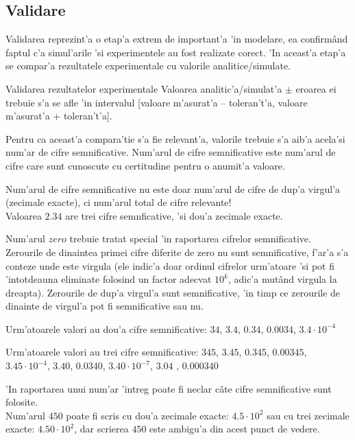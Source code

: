 \subsection*{Validare}

Validarea reprezint'a o etap'a extrem de important'a 'in modelare, ea confirm\^and faptul c'a simul'arile 'si experimentele au fost realizate corect. 'In aceast'a etap'a se compar'a rezultatele experimentale cu valorile analitice/simulate. 

\begin{retine}Validarea rezultatelor experimentale
Valoarea analitic'a/simulat'a $\pm$ eroarea ei trebuie s'a se afle 'in intervalul [valoare m'asurat'a -- toleran't'a, valoare m'asurat'a + toleran't'a].
\end{retine}

Pentru ca aceast'a compara'tie s'a fie relevant'a, valorile trebuie s'a aib'a acela'si num'ar de cifre semnificative. Num'arul de cifre semnificative este num'arul de cifre care sunt cunoscute cu certitudine pentru o anumit'a valoare. 

\begin{retine}
Num'arul de cifre semnificative nu este doar num'arul de cifre de dup'a virgul'a (zecimale exacte), ci num'arul total de cifre relevante! \\ 
Valoarea $2.34$ are trei cifre semnficative, 'si dou'a zecimale exacte.
\end{retine}

Num'arul $zero$ trebuie tratat special 'in raportarea cifrelor semnificative. Zerourile de dinaintea primei cifre diferite de zero nu sunt semnificative, f'ar'a s'a conteze unde este virgula (ele indic'a doar ordinul cifrelor urm'atoare 'si pot fi 'intotdeauna eliminate folosind un factor adecvat $10^k$, adic'a mut\^and virgula la dreapta). Zerourile de dup'a virgul'a sunt semnificative, 'in timp ce zerourile de dinainte de virgul'a pot fi semnificative sau nu.
 
\begin{example} Urm'atoarele valori au dou'a cifre semnificative:
$34$, $3.4$, $0.34$, $0.0034$, $3.4\cdot 10^{-4}$ 
\end{example}

\begin{example} Urm'atoarele valori au trei cifre semnificative:
$345$, $3.45$, $0.345$, $0.00345$, $3.45\cdot 10^{-4}$, $3.40$, $0.0340$, $3.40\cdot 10^{-7}$, $3.04$ , $0.000340$
\end{example}

\begin{retine}
'In raportarea unui num'ar 'intreg poate fi neclar c\^ate cifre semnificative sunt folosite. \\
Num'arul $450$ poate fi scris cu dou'a zecimale exacte: $4.5\cdot 10^2$ sau cu trei zecimale exacte: $4.50\cdot 10^2$, dar scrierea $450$ este ambigu'a din acest punct de vedere.
\end{retine}

